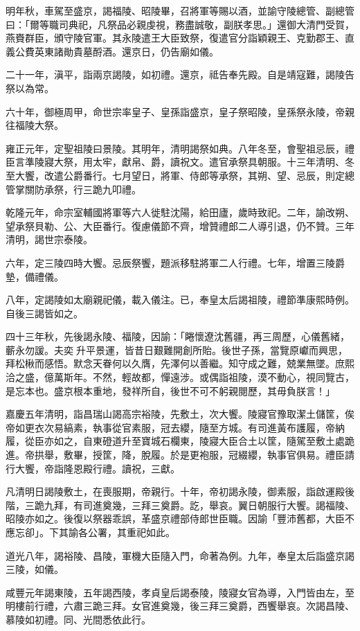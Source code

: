 \begin{pinyinscope}
明年秋，車駕至盛京，謁福陵、昭陵畢，召將軍等賜以酒，並諭守陵總管、副總管曰：「爾等職司典祀，凡祭品必親虔視，務盡誠敬，副朕孝思。」還御大清門受賀，燕賚群臣，頒守陵官軍。其永陵遣王大臣致祭，復遣官分詣穎親王、克勤郡王、直義公費英東諸勛貴墓酹酒。還京日，仍告廟如儀。

二十一年，滇平，詣兩京謁陵，如初禮。還京，祗告奉先殿。自是靖寇難，謁陵告祭以為常。

六十年，御極周甲，命世宗率皇子、皇孫詣盛京，皇子祭昭陵，皇孫祭永陵，帝親往福陵大祭。

雍正元年，定聖祖陵曰景陵。其明年，清明謁祭如典。八年冬至，會聖祖忌辰，禮臣言準陵寢大祭，用太牢，獻帛、爵，讀祝文。遣官承祭具朝服。十三年清明、冬至大饗，改遣公爵番行。七月望日，將軍、侍郎等承祭，其朔、望、忌辰，則定總管掌關防承祭，行三跪九叩禮。

乾隆元年，命宗室輔國將軍等六人徙駐沈陽，給田廬，歲時致祀。二年，諭改朔、望承祭貝勒、公、大臣番行。復慮儀節不齊，增贊禮郎二人導引退，仍不贊。三年清明，謁世宗泰陵。

六年，定三陵四時大饗。忌辰祭饗，題派移駐將軍二人行禮。七年，增置三陵爵墊，備禮儀。

八年，定謁陵如太廟親祀儀，載入儀注。已，奉皇太后謁祖陵，禮節準康熙時例。自後三謁皆如之。

四十三年秋，先後謁永陵、福陵，因諭：「睠懷遼沈舊疆，再三周歷，心儀舊緒，蘄永勿諼。夫奕升平景運，皆昔日艱難開創所貽。後世子孫，當覽原巘而興思，拜松楸而感悟。默念天眷何以久膺，先澤何以善繼。知守成之難，兢業無墜。庶熙洽之盛，億萬斯年。不然，輕故都，憚遠涉。或偶詣祖陵，漠不動心，視同覽古，是忘本也。盛京根本重地，發祥所自，後世不可不躬親閱歷，其毋負朕言！」

嘉慶五年清明，詣昌瑞山謁高宗裕陵，先敷土，次大饗。陵寢官豫取潔土儲筐，俟帝如更衣次易縞素，執事從官素服，冠去纓，隨至方城。有司進黃布護履，帝納履，從臣亦如之，自東磴道升至寶城石欄東，陵寢大臣合土以筐，隨駕至敷土處跪進。帝拱舉，敷畢，授筐，降，脫履。於是更袍服，冠綴纓，執事官俱易。禮臣請行大饗，帝詣隆恩殿行禮。讀祝，三獻。

凡清明日謁陵敷土，在喪服期，帝親行。十年，帝初謁永陵，御素服，詣啟運殿後階，三跪九拜，有司進奠幾，三拜三奠爵。訖，舉哀。翼日朝服行大饗。謁福陵、昭陵亦如之。後復以祭器乖誤，革盛京禮部侍郎世臣職。因諭「豐沛舊都，大臣不應忘卻」。下其諭各公署，其重祀如此。

道光八年，謁裕陵、昌陵，軍機大臣隨入門，命著為例。九年，奉皇太后詣盛京謁三陵，如儀。

咸豐元年謁東陵，五年謁西陵，孝貞皇后謁泰陵，陵寢女官為導，入門皆由左，至明樓前行禮，六肅三跪三拜。女官進奠幾，後三拜三奠爵，西饗舉哀。次謁昌陵、慕陵如初禮。同、光間悉依此行。


\end{pinyinscope}
